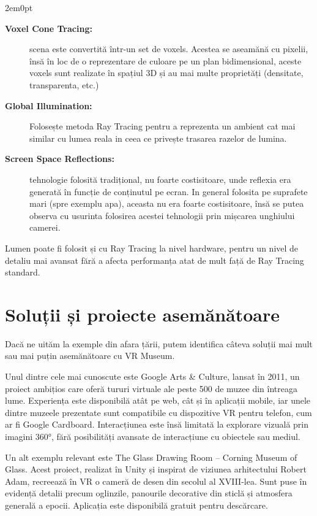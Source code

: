 \begin{adjustwidth}{2em}{0pt}
\begin{description}
    \item[\textbf{Voxel Cone Tracing:}] scena este convertită într-un set de voxels. Acestea se aseamănă cu pixelii, însă în loc de o reprezentare de culoare pe un plan bidimensional, aceste voxels sunt realizate în spațiul 3D și au mai multe proprietăți (densitate, transparenta, etc.) 
    \item[\textbf{Global Illumination:}] Folosește metoda Ray Tracing pentru a reprezenta un ambient cat mai similar cu lumea reala in ceea ce privește trasarea razelor de lumina.
    \item[\textbf{Screen Space Reflections:}] tehnologie folosită tradițional, nu foarte costisitoare, unde reflexia era generată în funcție de conținutul pe ecran. In general folosita pe suprafete mari (spre exemplu apa), aceasta nu era foarte costisitoare, însă se putea observa cu usurinta folosirea acestei tehnologii prin mișcarea unghiului camerei.
\end{description}
\end{adjustwidth}

\noindent Lumen poate fi folosit și cu Ray Tracing la nivel hardware, pentru un nivel de detaliu mai avansat fără a afecta performanța atat de mult față de Ray Tracing standard.







\section{Soluții și proiecte asemănătoare}

Dacă ne uităm la exemple din afara țării, putem identifica câteva soluții mai mult sau mai puțin asemănătoare cu VR Museum.

Unul dintre cele mai cunoscute este Google Arts \& Culture, lansat în 2011, un proiect ambițios care oferă tururi virtuale ale peste 500 de muzee din întreaga lume. Experiența este disponibilă atât pe web, cât și în aplicații mobile, iar unele dintre muzeele prezentate sunt compatibile cu dispozitive VR pentru telefon, cum ar fi Google Cardboard. Interacțiunea este însă limitată la explorare vizuală prin imagini 360°, fără posibilități avansate de interacțiune cu obiectele sau mediul.

Un alt exemplu relevant este The Glass Drawing Room – Corning Museum of Glass. Acest proiect, realizat în Unity și inspirat de viziunea arhitectului Robert Adam, recreează în VR o cameră de desen din secolul al XVIII-lea. Sunt puse în evidență detalii precum oglinzile, panourile decorative din sticlă și atmosfera generală a epocii. Aplicația este disponibilă gratuit pentru descărcare.

